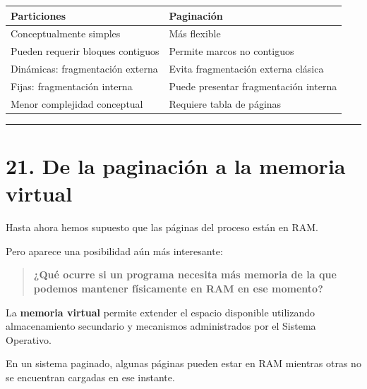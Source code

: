 \documentclass[
  spanish,
  letterpaper,
]{scrbook}
\newcounter{none} %
\begin{document}
{\def\LTcaptype{none} %
\begin{longtable}[]{@{}
  >{\raggedright\arraybackslash}p{}
  >{\raggedright\arraybackslash}p{}@{}}
\toprule\noalign{}
\begin{minipage}[b]{\linewidth}\raggedright
Particiones
\end{minipage} & \begin{minipage}[b]{\linewidth}\raggedright
Paginación
\end{minipage} \\
\midrule\noalign{}
\endhead
\bottomrule\noalign{}
\endlastfoot
Conceptualmente simples & Más flexible \\
Pueden requerir bloques contiguos & Permite marcos no contiguos \\
Dinámicas: fragmentación externa & Evita fragmentación externa
clásica \\
Fijas: fragmentación interna & Puede presentar fragmentación interna \\
Menor complejidad conceptual & Requiere tabla de páginas \\
\end{longtable}
}

\begin{center}\rule{0.5\linewidth}{0.5pt}\end{center}


\chapter{21. De la paginación a la memoria
virtual}\label{de-la-paginaciuxf3n-a-la-memoria-virtual}

Hasta ahora hemos supuesto que las páginas del proceso están en RAM.

Pero aparece una posibilidad aún más interesante:

\begin{quote}
\textbf{¿Qué ocurre si un programa necesita más memoria de la que
podemos mantener físicamente en RAM en ese momento?}
\end{quote}

La \textbf{memoria virtual} permite extender el espacio disponible
utilizando almacenamiento secundario y mecanismos administrados por el
Sistema Operativo.

En un sistema paginado, algunas páginas pueden estar en RAM mientras
otras no se encuentran cargadas en ese instante.
\end{document}
